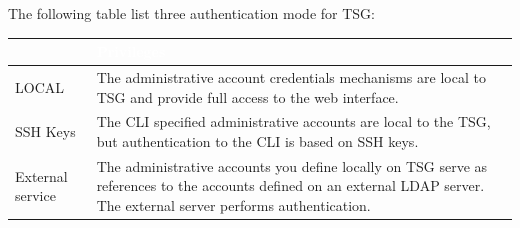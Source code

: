 The following table list three authentication mode for TSG:\\
\begin{table}[h]
    \begin{tabularx}{\textwidth}{p{}|p{}}
    \rowcolor{black}\multicolumn{1}{l!{\color{white}\vrule width 0.5pt}}{\textcolor{white}{Authentication Mode}}  & \textcolor{white}{Privileges} \\\hline                                                                                                                                                          
    LOCAL & The administrative account credentials mechanisms are local to TSG and provide full access to the web interface.\\\hline                                                                                                            
    SSH Keys & The CLI specified administrative accounts are local to the TSG, but authentication to the CLI is based on SSH keys.\\\hline                                                                                                         
    External service & The administrative accounts you define locally on TSG serve as references to the accounts defined on an external LDAP server. The external server performs authentication.\\\hline 
    \end{tabularx}
\end{table}
